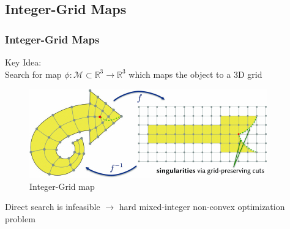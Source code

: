 \documentclass[
	11pt, %
	aspectratio=169, %
]{beamer}
\begin{document}

\subsection{Integer-Grid Maps}
\begin{frame}
	\frametitle{Integer-Grid Maps}
	Key Idea: \\
	Search for map $\phi : \mathcal{M} \subset \mathbb{R}^3 \to \mathbb{R}^3$
	which maps the object to a 3D grid

	\begin{figure}
		\includegraphics[width=0.5\linewidth]{integer-grid-rough.png}
		\caption{Integer-Grid map \cite{survey}}
	\end{figure}
	Direct search is infeasible $\rightarrow$ hard mixed-integer non-convex optimization problem	
\end{frame}
	
	
	
	
\end{document}
